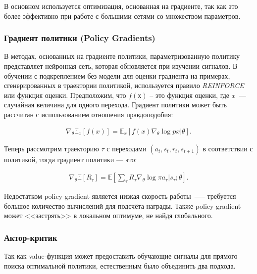 В основном используется оптимизация, основанная на градиенте, так как это более эффективно при работе с большими сетями со множеством параметров. \cite{Arulkumaran_2017}

\subsubsection{Градиент политики (Policy Gradients)}

В методах, основанных на градиенте политики, параметризованную политику представляет нейронная сеть, которая обновляется при изучении сигналов. В обучении с подкреплением без модели для оценки градиента на примерах, сгенерированных в траектории политикой, используется правило {\itshape REINFORCE} или функция оценки. Предположим, что $f(х)$ – это функция оценки, где $x$~--- случайная величина для одного перехода. Градиент политики может быть рассчитан с использованием отношения правдоподобия:

\begin{equation}
    \label{eq:ch1-likelihood-ratios}
    \begin{multlined}
        \nabla_\theta \mathbb{E}_x[f(x)] = \mathbb{E}_x[f(x) \nabla_\theta \log p x|\theta].
    \end{multlined}
\end{equation}

Теперь рассмотрим траекторию $\tau$ с переходами $(a_t, s_t, r_t, s_{t+1})$ в соответствии с политикой, тогда градиент политики --- это:

\begin{equation}
    \label{eq:ch1-likelihood-ratios}
    \begin{multlined}
        \nabla_\theta \mathbb{E}[R_\tau] = \mathbb{E}[\sum_\tau R_\tau \nabla_\theta \log \pi {a_\tau|s_\tau;\theta}].
    \end{multlined}
\end{equation}

Недостатком policy gradient является низкая скорость работы~—-- требуется большое количество вычислений для подсчёта награды. Также policy gradient может <<застрять>> в локальном оптимуме, не найдя глобального.

\subsubsection{Актор-критик}

Так как value-функция может предоставить обучающие сигналы для прямого поиска оптимальной политики, естественным было объединить два подхода.

